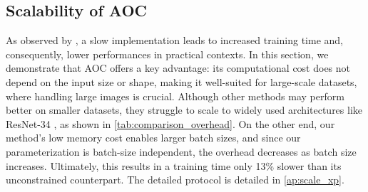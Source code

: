 \subsection{Scalability of AOC}
    As observed by \cite{prach_1-lipschitz_2023}, a slow implementation leads to increased training time and, consequently, lower performances in practical contexts. In this section, we demonstrate that AOC offers a key advantage: its computational cost does not depend on the input size or shape, making it well-suited for large-scale datasets, where handling large images is crucial. Although other methods may perform better on smaller datasets, they struggle to scale to widely used architectures like ResNet-34 \cite{he_deep_2015}, as shown in \cref{tab:comparison_overhead}. On the other end, our method’s low memory cost enables larger batch sizes, and since our parameterization is batch-size independent, the overhead decreases as batch size increases. Ultimately, this results in a training time only 13\% slower than its unconstrained counterpart. The detailed protocol is detailed in \cref{ap:scale_xp}.
